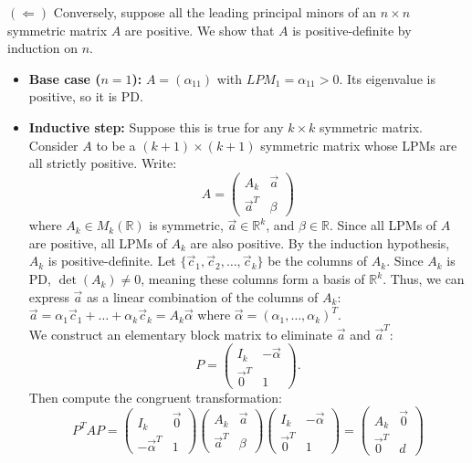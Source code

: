 \begin{pfbox}
	$(\Leftarrow)$ Conversely, suppose all the leading principal minors of an $n \times n$ symmetric matrix $A$ are positive. We show that $A$ is positive-definite by induction on $n$.
	\begin{itemize}
		\item \textbf{Base case ($n=1$):} $A = (\alpha_{11})$ with $LPM_1 = \alpha_{11} > 0$. Its eigenvalue is positive, so it is PD.
		\item \textbf{Inductive step:} Suppose this is true for any $k \times k$ symmetric matrix. Consider $A$ to be a $(k+1) \times (k+1)$ symmetric matrix whose LPMs are all strictly positive. Write:
		      \[
			      A = \begin{pmatrix} A_k & \vec{a} \\ \vec{a}^T & \beta \end{pmatrix}
		      \]
		      where $A_k \in M_k(\mathbb{R})$ is symmetric, $\vec{a} \in \mathbb{R}^k$, and $\beta \in \mathbb{R}$. Since all LPMs of $A$ are positive, all LPMs of $A_k$ are also positive. By the induction hypothesis, $A_k$ is positive-definite. Let $\{\vec{c}_1, \vec{c}_2, \dots, \vec{c}_k\}$ be the columns of $A_k$. Since $A_k$ is PD, $\det(A_k) \ne 0$, meaning these columns form a basis of $\mathbb{R}^k$. Thus, we can express $\vec{a}$ as a linear combination of the columns of $A_k$: $\vec{a} = \alpha_1 \vec{c}_1 + \dots + \alpha_k \vec{c}_k = A_k \vec{\alpha}$ where $\vec{\alpha} = (\alpha_1, \dots, \alpha_k)^T$.\\
		      We construct an elementary block matrix to eliminate $\vec{a}$ and $\vec{a}^T$:
		      \[
			      P = \begin{pmatrix} I_k & -\vec{\alpha} \\ \vec{0}^T & 1 \end{pmatrix}.
		      \]
		      Then compute the congruent transformation:
		      \[
			      P^T A P = \begin{pmatrix} I_k & \vec{0} \\ -\vec{\alpha}^T & 1 \end{pmatrix} \begin{pmatrix} A_k & \vec{a} \\ \vec{a}^T & \beta \end{pmatrix} \begin{pmatrix} I_k & -\vec{\alpha} \\ \vec{0}^T & 1 \end{pmatrix} = \begin{pmatrix} A_k & \vec{0} \\ \vec{0}^T & d \end{pmatrix}
\]
\end{itemize}
\end{pfbox}
